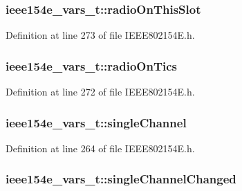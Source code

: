 \subsubsection[{\texorpdfstring{radio\+On\+This\+Slot}{radioOnThisSlot}}]{ ieee154e\+\_\+vars\+\_\+t\+::radio\+On\+This\+Slot}\hypertarget{structieee154e__vars__t_aedad9f8092e08ef46f00dba154418915}{}\label{structieee154e__vars__t_aedad9f8092e08ef46f00dba154418915}


Definition at line 273 of file I\+E\+E\+E802154\+E.\+h.

\subsubsection[{\texorpdfstring{radio\+On\+Tics}{radioOnTics}}]{ ieee154e\+\_\+vars\+\_\+t\+::radio\+On\+Tics}\hypertarget{structieee154e__vars__t_a5b065d4ae77d4e4215afa6d6e17686ed}{}\label{structieee154e__vars__t_a5b065d4ae77d4e4215afa6d6e17686ed}


Definition at line 272 of file I\+E\+E\+E802154\+E.\+h.

\subsubsection[{\texorpdfstring{single\+Channel}{singleChannel}}]{ ieee154e\+\_\+vars\+\_\+t\+::single\+Channel}\hypertarget{structieee154e__vars__t_a34565f0e2e73140299fb3fed4a3a4c9b}{}\label{structieee154e__vars__t_a34565f0e2e73140299fb3fed4a3a4c9b}


Definition at line 264 of file I\+E\+E\+E802154\+E.\+h.

\subsubsection[{\texorpdfstring{single\+Channel\+Changed}{singleChannelChanged}}]{ ieee154e\+\_\+vars\+\_\+t\+::single\+Channel\+Changed}\hypertarget{structieee154e__vars__t_ab015fa5dafba6da674e38dcb30a8b603}{}\label{structieee154e__vars__t_ab015fa5dafba6da674e38dcb30a8b603}


